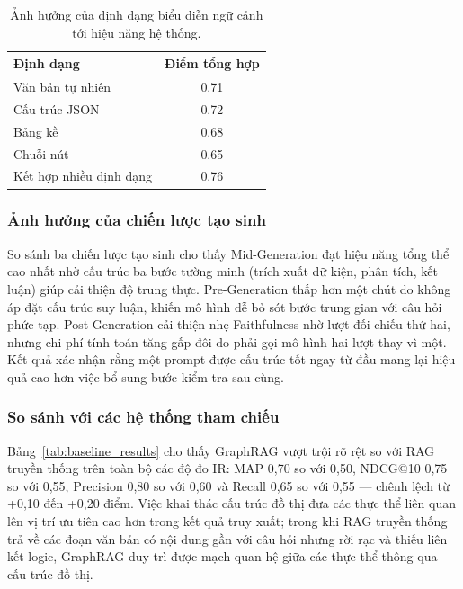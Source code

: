 \begin{table}[h]
\centering
\caption{Ảnh hưởng của định dạng biểu diễn ngữ cảnh tới hiệu năng hệ thống.}
\label{tab:format_results}
\begin{tabular}{lc}
\hline
\textbf{Định dạng} & \textbf{Điểm tổng hợp} \\
\hline
Văn bản tự nhiên        & 0.71 \\
Cấu trúc JSON           & 0.72 \\
Bảng kề                 & 0.68 \\
Chuỗi nút               & 0.65 \\
Kết hợp nhiều định dạng & 0.76 \\
\hline
\end{tabular}
\end{table}

\subsubsection{Ảnh hưởng của chiến lược tạo sinh}

So sánh ba chiến lược tạo sinh cho thấy Mid-Generation đạt hiệu năng tổng thể cao nhất nhờ cấu trúc ba bước tường minh (trích xuất dữ kiện, phân tích, kết luận) giúp cải thiện độ trung thực. Pre-Generation thấp hơn một chút do không áp đặt cấu trúc suy luận, khiến mô hình dễ bỏ sót bước trung gian với câu hỏi phức tạp. Post-Generation cải thiện nhẹ Faithfulness nhờ lượt đối chiếu thứ hai, nhưng chi phí tính toán tăng gấp đôi do phải gọi mô hình hai lượt thay vì một. Kết quả xác nhận rằng một prompt được cấu trúc tốt ngay từ đầu mang lại hiệu quả cao hơn việc bổ sung bước kiểm tra sau cùng.

\subsubsection{So sánh với các hệ thống tham chiếu}

Bảng~\ref{tab:baseline_results} cho thấy GraphRAG vượt trội rõ rệt so với RAG truyền thống trên toàn bộ các độ đo IR: MAP 0,70 so với 0,50, NDCG@10 0,75 so với 0,55, Precision 0,80 so với 0,60 và Recall 0,65 so với 0,55 --- chênh lệch từ +0,10 đến +0,20 điểm. Việc khai thác cấu trúc đồ thị đưa các thực thể liên quan lên vị trí ưu tiên cao hơn trong kết quả truy xuất; trong khi RAG truyền thống trả về các đoạn văn bản có nội dung gần với câu hỏi nhưng rời rạc và thiếu liên kết logic, GraphRAG duy trì được mạch quan hệ giữa các thực thể thông qua cấu trúc đồ thị.


